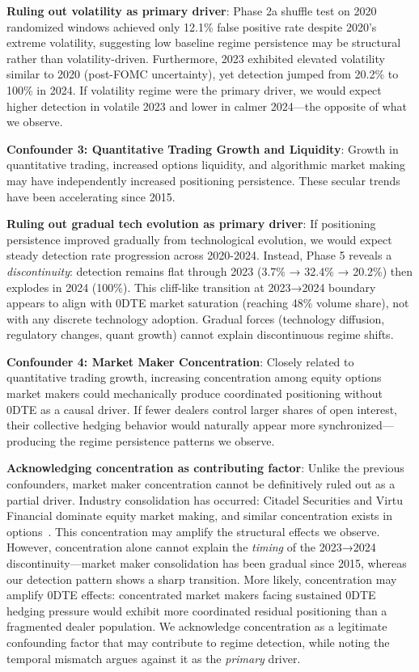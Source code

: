\noindent\textbf{Ruling out volatility as primary driver}: Phase 2a shuffle test on 2020 randomized windows achieved only 12.1\% false positive rate despite 2020's extreme volatility, suggesting low baseline regime persistence may be structural rather than volatility-driven. Furthermore, 2023 exhibited elevated volatility similar to 2020 (post-FOMC uncertainty), yet detection jumped from 20.2\% to 100\% in 2024. If volatility regime were the primary driver, we would expect higher detection in volatile 2023 and lower in calmer 2024—the opposite of what we observe.

\vspace{0.2cm}

\noindent\textbf{Confounder 3: Quantitative Trading Growth and Liquidity}: Growth in quantitative trading, increased options liquidity, and algorithmic market making may have independently increased positioning persistence. These secular trends have been accelerating since 2015.

\noindent\textbf{Ruling out gradual tech evolution as primary driver}: If positioning persistence improved gradually from technological evolution, we would expect steady detection rate progression across 2020-2024. Instead, Phase 5 reveals a \textit{discontinuity}: detection remains flat through 2023 (3.7\% → 32.4\% → 20.2\%) then explodes in 2024 (100\%). This cliff-like transition at 2023→2024 boundary appears to align with 0DTE market saturation (reaching 48\% volume share), not with any discrete technology adoption. Gradual forces (technology diffusion, regulatory changes, quant growth) cannot explain discontinuous regime shifts.

\vspace{0.2cm}

\noindent\textbf{Confounder 4: Market Maker Concentration}: Closely related to quantitative trading growth, increasing concentration among equity options market makers could mechanically produce coordinated positioning without 0DTE as a causal driver. If fewer dealers control larger shares of open interest, their collective hedging behavior would naturally appear more synchronized—producing the regime persistence patterns we observe.

\noindent\textbf{Acknowledging concentration as contributing factor}: Unlike the previous confounders, market maker concentration cannot be definitively ruled out as a partial driver. Industry consolidation has occurred: Citadel Securities and Virtu Financial dominate equity market making, and similar concentration exists in options~\cite{cboe2024market}. This concentration may amplify the structural effects we observe. However, concentration alone cannot explain the \textit{timing} of the 2023→2024 discontinuity—market maker consolidation has been gradual since 2015, whereas our detection pattern shows a sharp transition. More likely, concentration may amplify 0DTE effects: concentrated market makers facing sustained 0DTE hedging pressure would exhibit more coordinated residual positioning than a fragmented dealer population. We acknowledge concentration as a legitimate confounding factor that may contribute to regime detection, while noting the temporal mismatch argues against it as the \textit{primary} driver.

